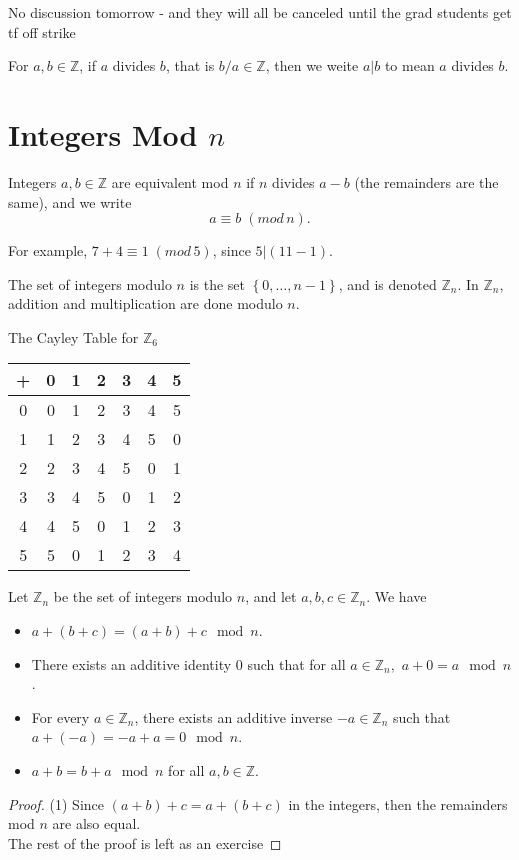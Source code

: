 
\noindent No discussion tomorrow - and they will all be canceled until the grad students get tf off strike

\begin{notation}
	For $a,b\in\mathbb{Z}$, if $a$ divides $b$, that is $b/a\in\mathbb{Z}$, then we weite $a|b$ to mean $a$ divides $b$.
\end{notation}
\section{Integers Mod $n$}
\begin{definition}\label{dfn:3}
	Integers $a,b\in\mathbb{Z}$ are equivalent mod $n$ if $n$ divides $a-b$ (the remainders are the same), and we write
	\[
		a\equiv b\;(mod\,n)
	.\]
\end{definition}
For example, $7+4\equiv 1\;(mod\,5)$, since $5|(11-1)$.
\begin{definition}\label{dfn:4}
	The set of integers modulo $n$ is the set $\left\{ 0,\ldots,n-1 \right\}$, and is denoted $\mathbb{Z}_n$. In $\mathbb{Z}_n$, addition and multiplication are done modulo $n$.
\end{definition}
\begin{center}
	The Cayley Table for $\mathbb{Z}_6$ \\
	\begin{tabular}{c|cccccc}
		+&0&1&2&3&4&5\\
		\hline
		0&0&1&2&3&4&5\\
		1&1&2&3&4&5&0\\
		2&2&3&4&5&0&1\\
		3&3&4&5&0&1&2\\
		4&4&5&0&1&2&3\\
		5&5&0&1&2&3&4
	\end{tabular}
\end{center}
\begin{proposition}
	Let $\mathbb{Z}_n$ be the set of integers modulo $n$, and let $a,b,c\in\mathbb{Z}_n$. We have
	\begin{itemize}
		\item $a+(b+c)=(a+b)+c\mod n$.
		\item  There exists an additive identity  $0$ such that for all $a\in\mathbb{Z}_n,$ $a+0=a\mod n$.
		\item For every $a\in\mathbb{Z}_n$, there exists an additive inverse $-a\in\mathbb{Z}_n$ such that $a+(-a)=-a+a=0\mod n$.
		\item $a+b=b+a\mod n$ for all $a,b\in\mathbb{Z}$.
	\end{itemize}
\end{proposition}
\begin{proof}
	(1) Since $(a+b)+c=a+(b+c)$ in the integers, then the remainders mod $n$ are also equal.\\
	The rest of the proof is left as an exercise
\end{proof}
